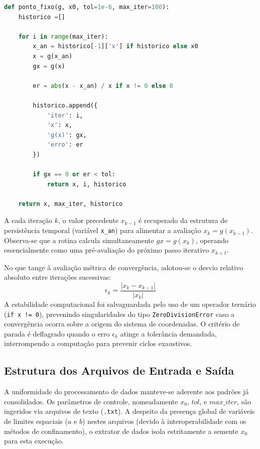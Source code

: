 \begin{lstlisting}[language=Python, caption={Código de implementação do Método do Ponto Fixo}, label={lst:ponto_fixo_codigo}]
def ponto_fixo(g, x0, tol=1e-6, max_iter=100):
    historico =[] 
    
    for i in range(max_iter):
        x_an = historico[-1]['x'] if historico else x0  
        x = g(x_an)
        gx = g(x)
        
        er = abs(x - x_an) / x if x != 0 else 0
        
        historico.append({
            'iter': i, 
            'x': x, 
            'g(x)': gx,
            'erro': er
        })
        
        if gx == 0 or er < tol:
            return x, i, historico
            
    return x, max_iter, historico
\end{lstlisting}

A cada iteração $k$, o valor precedente $x_{k-1}$ é recuperado da estrutura de persistência temporal (variável \texttt{x\_an}) para alimentar a avaliação $x_k = g(x_{k-1})$. Observa-se que a rotina calcula simultaneamente $gx = g(x_k)$, operando essencialmente como uma pré-avaliação do próximo passo iterativo $x_{k+1}$.

No que tange à avaliação métrica de convergência, adotou-se o desvio relativo absoluto entre iterações sucessivas:
\begin{equation}
    \epsilon_k = \frac{|x_k - x_{k-1}|}{|x_k|}
\end{equation}
A estabilidade computacional foi salvaguardada pelo uso de um operador ternário (\texttt{if x != 0}), prevenindo singularidades do tipo \texttt{ZeroDivisionError} caso a convergência ocorra sobre a origem do sistema de coordenadas. O critério de parada é deflagrado quando o erro $\epsilon_k$ atinge a tolerância demandada, interrompendo a computação para prevenir ciclos exaustivos.

\subsection{Estrutura dos Arquivos de Entrada e Saída}
\label{subsec:estrutura_arquivos_ponto_fixo}

A uniformidade do processamento de dados manteve-se aderente aos padrões já consolidados. Os parâmetros de controle, nomeadamente $x_0$, $tol$, e $max\_iter$, são ingeridos via arquivos de texto (\texttt{.txt}). A despeito da presença global de variáveis de limites espaciais ($a$ e $b$) nestes arquivos (devido à interoperabilidade com os métodos de confinamento), o extrator de dados isola estritamente a semente $x_0$ para esta execução. 

